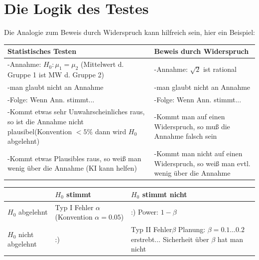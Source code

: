\documentclass[10pt]{report}
\theoremstyle{definition}
\begin{document}
\section{Die Logik des Testes}
Die Analogie zum Beweis durch Widerspruch kann hilfreich sein, hier ein Beispiel:\\
\begin{tabularx}{\linewidth}{|L|L|}  
	\hline
	Statistisches Testen & Beweis durch Widerspruch \\ \hline
	-Annahme: $H_0: \mu_1 = \mu_2$ (Mittelwert d. Gruppe 1 ist MW d. Gruppe 2)  & -Annahme: $\sqrt{2}$ ist rational \\
	-man glaubt nicht an Annahme & -man glaubt nicht an Annahme \\
	-Folge: Wenn Ann. stimmt... & -Folge: Wenn Ann. stimmt... \\
	-Kommt etwas sehr Unwahrscheinliches raus, so ist die Annahme nicht plausibel(Konvention $< 5\%$ dann wird $H_0$ abgelehnt) & -Kommt man auf einen Widerspruch, so muß die Annahme falsch sein \\
	-Kommt etwas Plausibles raus, so weiß man wenig über die Annahme (KI kann helfen) & -Kommt man nicht auf einen Widerspruch, so weiß man evtl. wenig über die Annahme \\ \hline
\end{tabularx}
\begin{tabularx}{\linewidth}{|L|L|L|}
	\hline
	& $H_0$ stimmt & $H_0$ stimmt nicht \\ \hline
	$H_0$ abgelehnt & Typ I Fehler \newline $\alpha$ \newline (Konvention $\alpha = 0.05$) & :) \newline Power: $1-\beta$ \\
	$H_0$ nicht abgelehnt & :) & Typ II Fehler\newline $\beta$ \newline Planung: $\beta=0.1 ... 0.2$ erstrebt... Sicherheit über $\beta$ hat man nicht \\ \hline
\end{tabularx}
\end{document}
